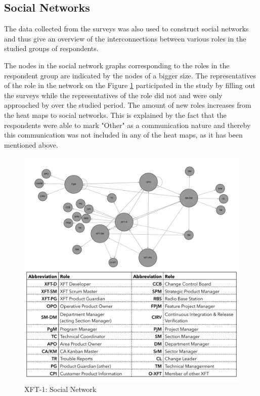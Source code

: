 \subsection{Social Networks}
The data collected from the surveys was also used to construct social networks and thus give an overview of the interconnections between various roles in the studied groups of respondents.

The nodes in the social network graphs corresponding to the roles in the respondent group are indicated by the nodes of a bigger size. The representatives of the  role in the network on the Figure \ref{fig:ms2-sn} participated in the study by filling out the surveys while the representatives of the  role did not and were only approached by  over the studied period. The amount of new roles increases from the heat maps to social networks. This is explained by the fact that the respondents were able to mark "Other" as a communication nature and thereby this communication was not included in any of the heat maps, as it has been mentioned above.

\begin{figure}[h!]
  \centering
  \includegraphics[width=1\textwidth]{figures/sn/sn-ms2-legend.pdf}
  \caption{XFT-1: Social Network}
  \label{fig:ms2-sn}
\end{figure}

